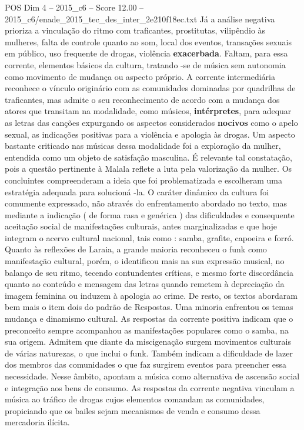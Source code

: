 \begin{textsample}{POS Dim 4 – 2015\_c6 – Score 12.00 – 2015\_c6/enade\_2015\_tec\_des\_inter\_2e210f18ec.txt}
Já a análise negativa prioriza a vinculação do ritmo com traficantes, prostitutas, vilipêndio às mulheres, falta de controle quanto ao som, local dos eventos, transações sexuais em público, uso frequente de drogas, violência \textbf{exacerbada}.
Faltam, para essa corrente, elementos básicos da cultura, tratando -se de música sem autonomia como movimento de mudança ou aspecto próprio.
A corrente intermediária reconhece o vínculo originário com as comunidades dominadas por quadrilhas de traficantes, mas admite o seu reconhecimento de acordo com a mudança dos atores que transitam na modalidade, como músicos, \textbf{intérpretes}, para adequar as letras das canções expurgando os aspectos considerados \textbf{nocivos} como o apelo sexual, as indicações positivas para a violência e apologia às drogas.
Um aspecto bastante criticado nas músicas dessa modalidade foi a exploração da mulher, entendida como um objeto de satisfação masculina.
É relevante tal constatação, pois a questão pertinente à Malala reflete a luta pela valorização da mulher.
Os concluintes compreenderam a ideia que foi problematizada e escolheram uma estratégia adequada para solucioná -la.
O caráter dinâmico da cultura foi comumente expressado, não através do enfrentamento abordado no texto, mas mediante a indicação ( de forma rasa e genérica ) das dificuldades e consequente aceitação social de manifestações culturais, antes marginalizadas e que hoje integram o acervo cultural nacional, tais como : samba, grafite, capoeira e forró.
Quanto às reflexões de Laraia, a grande maioria reconheceu o funk como manifestação cultural, porém, o identificou mais na sua expressão musical, no balanço de seu ritmo, tecendo contundentes críticas, e mesmo forte discordância quanto ao conteúdo e mensagem das letras quando remetem à depreciação da imagem feminina ou induzem à apologia ao crime.
De resto, os textos abordaram bem mais o item dois do padrão de Respostas.
Uma minoria enfrentou os temas mudança e dinamismo cultural.
As respostas da corrente positiva indicam que o preconceito sempre acompanhou as manifestações populares como o samba, na sua origem.
Admitem que diante da miscigenação surgem movimentos culturais de várias naturezas, o que inclui o funk.
Também indicam a dificuldade de lazer dos membros das comunidades o que faz surgirem eventos para preencher essa necessidade.
Nesse âmbito, apontam a música como alternativa de ascensão social e integração aos bens de consumo.
As respostas da corrente negativa vinculam a música ao tráfico de drogas cujos elementos comandam as comunidades, propiciando que os bailes sejam mecanismos de venda e consumo dessa mercadoria ilícita.

\end{textsample}

